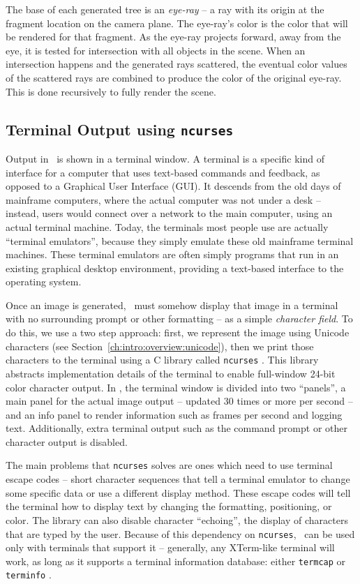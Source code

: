 The base of each generated tree is an {\it eye-ray} -- a ray with its origin at the fragment location on the camera plane.
The eye-ray's color is the color that will be rendered for that fragment.
As the eye-ray projects forward, away from the eye, it is tested for intersection with all objects in the scene.
When an intersection happens and the generated rays scattered, the eventual color values of the scattered rays are combined to produce the color of the original eye-ray.
This is done recursively to fully render the scene.

\subsection{Terminal Output using \texttt{ncurses}}
\label{ch:intro:overview:ncurses}

Output in \name\ is shown in a terminal window.
A terminal is a specific kind of interface for a computer that uses text-based commands and feedback, as opposed to a Graphical User Interface (GUI).
It descends from the old days of mainframe computers, where the actual computer was not under a desk -- instead, users would connect over a network to the main computer, using an actual terminal machine.
Today, the terminals most people use are actually ``terminal emulators'', because they simply emulate these old mainframe terminal machines.
These terminal emulators are often simply programs that run in an existing graphical desktop environment, providing a text-based interface to the operating system.

Once an image is generated, \name\ must somehow display that image in a terminal with no surrounding prompt or other formatting -- as a simple {\it character field}.
To do this, we use a two step approach: first, we represent the image using Unicode characters (see Section~\ref{ch:intro:overview:unicode}), then we print those characters to the terminal using a C library called \texttt{ncurses} \cite{ncursesLibrary}.
This library abstracts implementation details of the terminal to enable full-window 24-bit color character output.
In \name, the terminal window is divided into two ``panels'', a main panel for the actual image output -- updated 30 times or more per second -- and an info panel to render information such as frames per second and logging text.
Additionally, extra terminal output such as the command prompt or other character output is disabled.

The main problems that \texttt{ncurses} solves are ones which need to use terminal escape codes -- short character sequences that tell a terminal emulator to change some specific data or use a different display method.
These escape codes will tell the terminal how to display text by changing the formatting, positioning, or color.
The library can also disable character ``echoing'', the display of characters that are typed by the user.
Because of this dependency on \texttt{ncurses}, \name\ can be used only with terminals that support it -- generally, any XTerm-like terminal will work, as long as it supports a terminal information database: either \texttt{termcap} or \texttt{terminfo} \cite{ncursesLibrary}.

